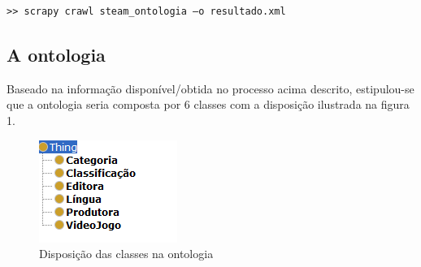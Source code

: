 \documentclass[a4paper,11pt]{article}
\theoremstyle{mytheor}
\begin{document}
\begin{itemize}
\begin{lstlisting}[label={stub:third},caption=Exemplo de captura do atributo $nome$ de cada jogo recorrendo a \textit{XPath} sobre a árvore \textit{HTML}.]
\end{lstlisting}
\begin{lstlisting}[label={stub:third},caption=Comando que exercita o código acima descrito e produz um documento \textit{XML} resultante.]
>> scrapy crawl steam_ontologia –o resultado.xml
\end{lstlisting}

\subsection{A ontologia}
Baseado na informação disponível/obtida no processo acima descrito, estipulou-se que a ontologia seria composta por 6 classes com a disposição ilustrada na figura 1.

\begin{figure}[!htb]
     \centering
      \includegraphics[scale=1]{classesontologia}
     \caption{Disposição das classes na ontologia}
     \label{fig1}
\end{figure} 
\newpage
\\


\end{itemize}
\end{document}
